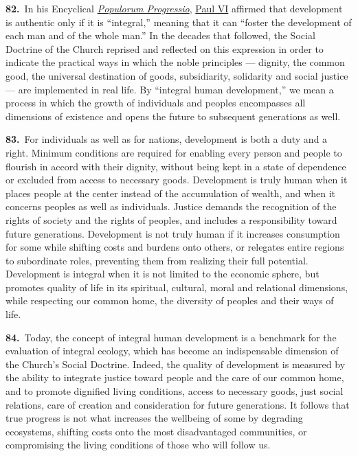 \documentclass{article}
\begin{document}
\textbf{82.}\ In his Encyclical \href{https://www.vatican.va/content/paul-vi/en/encyclicals/documents/hf_p-vi_enc_26031967_populorum.html}{\emph{Populorum Progressio}}, \href{https://www.vatican.va/content/paul-vi/en.html}{Paul VI} affirmed that development is authentic only if it is ``integral,'' meaning that it can ``foster the development of each man and of the whole man.''\cite{n110} In the decades that followed, the Social Doctrine of the Church reprised and reflected on this expression in order to indicate the practical ways in which the noble principles --- dignity, the common good, the universal destination of goods, subsidiarity, solidarity and social justice --- are implemented in real life. By ``integral human development,'' we mean a process in which the growth of individuals and peoples encompasses all dimensions of existence and opens the future to subsequent generations as well.

\textbf{83.}\ For individuals as well as for nations, development is both a duty and a right. Minimum conditions are required for enabling every person and people to flourish in accord with their dignity, without being kept in a state of dependence or excluded from access to necessary goods. Development is truly human when it places people at the center instead of the accumulation of wealth, and when it concerns peoples as well as individuals. Justice demands the recognition of the rights of society and the rights of peoples, and includes a responsibility toward future generations. Development is not truly human if it increases consumption for some while shifting costs and burdens onto others, or relegates entire regions to subordinate roles, preventing them from realizing their full potential.\cite{n111} Development is integral when it is not limited to the economic sphere, but promotes quality of life in its spiritual, cultural, moral and relational dimensions, while respecting our common home, the diversity of peoples and their ways of life.\cite{n112}

\textbf{84.}\ Today, the concept of integral human development is a benchmark for the evaluation of integral ecology, which has become an indispensable dimension of the Church's Social Doctrine. Indeed, the quality of development is measured by the ability to integrate justice toward people and the care of our common home, and to promote dignified living conditions, access to necessary goods, just social relations, care of creation and consideration for future generations. It follows that true progress is not what increases the wellbeing of some by degrading ecosystems, shifting costs onto the most disadvantaged communities, or compromising the living conditions of those who will follow us.
\end{document}
